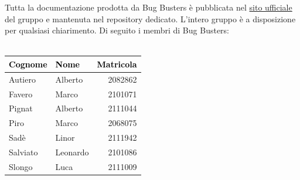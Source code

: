 \documentclass[a4paper,11pt]{article}
\begin{document}
Tutta la documentazione prodotta da Bug Busters è pubblicata nel \href{https://bugbustersunipd.github.io/BugBusterSite/}{sito ufficiale} del gruppo e mantenuta nel repository dedicato.
L'intero gruppo è a disposizione per qualsiasi chiarimento. Di seguito i membri di Bug Busters: \\ \\ 
\begin{center}
\setlength{\arrayrulewidth}{0.8pt}
\begin{tabular}{|l|l|r|}
\hline
\rowcolor{primarycolor!20}
\textcolor{black}{\textbf{Cognome}} & \textcolor{black}{\textbf{Nome}} & \textcolor{black}{\textbf{Matricola}} \\
\hline
Autiero & Alberto & 2082862 \\
\hline
Favero & Marco & 2101071 \\
\hline
Pignat & Alberto & 2111044 \\
\hline
Piro & Marco & 2068075 \\
\hline
Sadè & Linor & 2111942 \\
\hline
Salviato & Leonardo & 2101086 \\
\hline
Slongo & Luca & 2111009 \\
\hline
\end{tabular}
\end{center}
\end{document}
